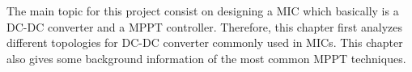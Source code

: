 The main topic for this project consist on designing a MIC which basically is a DC-DC converter and a MPPT controller. Therefore, this chapter first analyzes different topologies for DC-DC converter commonly used in MICs. This chapter also gives some background information of the most common MPPT techniques.

